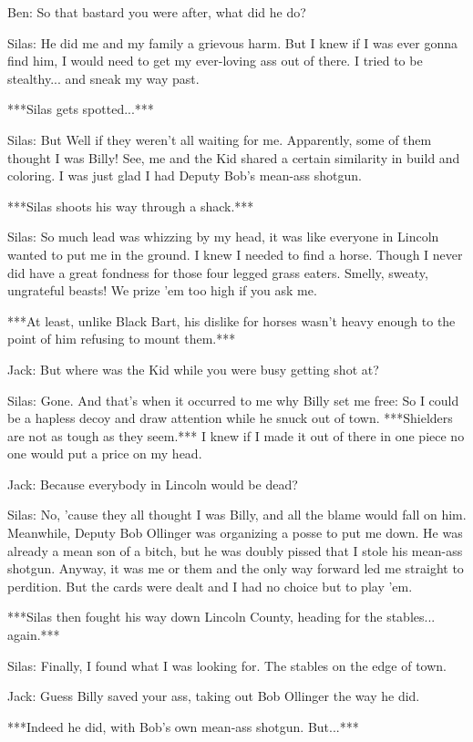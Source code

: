 \documentclass{article}
\begin{document}
Ben: So that bastard you were after, what did he do?

Silas: He did me and my family a grievous harm. But I knew if I was ever gonna find him, I would need to get my ever-loving ass out of there. I tried to be stealthy... and sneak my way past.

***Silas gets spotted...***

Silas: But Well if they weren't all waiting for me. Apparently, some of them thought I was Billy! See, me and the Kid shared a certain similarity in build and coloring. I was just glad I had Deputy Bob's mean-ass shotgun.

***Silas shoots his way through a shack.***

Silas: So much lead was whizzing by my head, it was like everyone in Lincoln wanted to put me in the ground. I knew I needed to find a horse. Though I never did have a great fondness for those four legged grass eaters. Smelly, sweaty, ungrateful beasts! We prize 'em too high if you ask me.

***At least, unlike Black Bart, his dislike for horses wasn't heavy enough to the point of him refusing to mount them.***

Jack: But where was the Kid while you were busy getting shot at?

Silas: Gone. And that's when it occurred to me why Billy set me free: So I could be a hapless decoy and draw attention while he snuck out of town. ***Shielders are not as tough as they seem.*** I knew if I made it out of there in one piece no one would put a price on my head.

Jack: Because everybody in Lincoln would be dead?

Silas: No, 'cause they all thought I was Billy, and all the blame would fall on him. Meanwhile, Deputy Bob Ollinger was organizing a posse to put me down. He was already a mean son of a bitch, but he was doubly pissed that I stole his mean-ass shotgun. Anyway, it was me or them and the only way forward led me straight to perdition. But the cards were dealt and I had no choice but to play 'em.

***Silas then fought his way down Lincoln County, heading for the stables... again.***

Silas: Finally, I found what I was looking for. The stables on the edge of town.

Jack: Guess Billy saved your ass, taking out Bob Ollinger the way he did.

***Indeed he did, with Bob's own mean-ass shotgun. But...***
\end{document}
